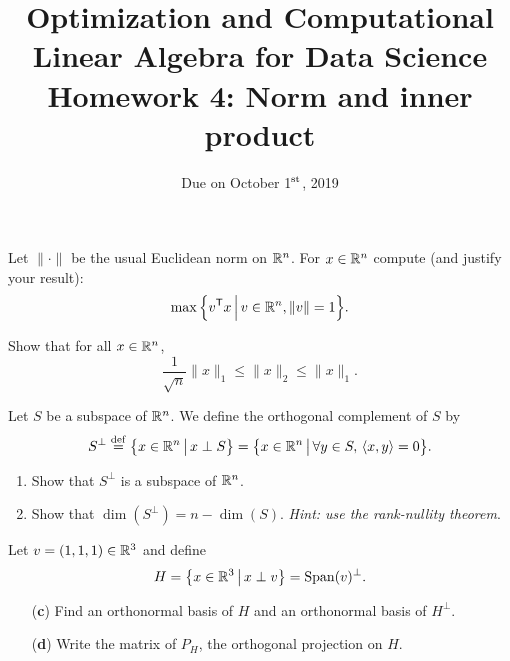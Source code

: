 \documentclass[11pt,nocut]{article}
\title{\vspace{-3.0cm}%
	Optimization and Computational Linear Algebra for Data Science\\
Homework 4: Norm and inner product}
\date{\vspace{-1cm}Due on October 1$^{\rm st}$, 2019}
\begin{document}
\maketitle




\begin{problem}[2 points]
	Let $\| \cdot \|$ be the usual Euclidean norm on $\mathbb{R}^n$.
	For $x \in \mathbb{R}^n$ compute (and justify your result):
	$$
	\max \Big\{ v^{{\sf T}} x \, \Big| \, v \in \mathbb{R}^n, \|v\|=1 \Big\}.
$$
\end{problem}

\vspace{1mm} 

\begin{problem}[2 points]
	Show that for all $x \in \mathbb{R}^n$,
	$$
	\frac{1}{\sqrt{n}} \|x\|_1 \leq \|x\|_2 \leq \|x\|_1.
	$$
\end{problem}

\vspace{1mm}



\begin{problem}[4 points]
	Let $S$ be a subspace of $\mathbb{R}^n$. We define the orthogonal complement of $S$ by
	$$
	S^{\perp} \overset{\rm def}{=} 
	\big\{ x \in \mathbb{R}^n \, \big| \, x \perp S \big\} = 
	\big\{ x \in \mathbb{R}^n \, \big| \, \forall y \in S, \, \langle x,y \rangle = 0 \big\}.
	$$
	\begin{enumerate}[label=\normalfont(\textbf{\alph*})]
		\item Show that $S^{\perp}$ is a subspace of $\mathbb{R}^n$.
		\item Show that $\dim(S^{\perp}) = n - \dim(S)$. \textit{Hint: use the rank-nullity theorem}.
	\end{enumerate}
	Let $v = (1,1,1) \in \mathbb{R}^3$ and define
	$$
	H = 
	\big\{ x \in \mathbb{R}^3 \, \big| \, x \perp v \big\} = {{\rm Span}}(v)^{\perp}.
	$$
	\begin{enumerate}[label=\normalfont(\textbf{\alph*})]
		\item[\normalfont(\textbf{c})] Find an orthonormal basis of $H$ and an orthonormal basis of $H^{\perp}$.
		\item[\normalfont(\textbf{d})] Write the matrix of $P_H$, the orthogonal projection on $H$.
	\end{enumerate}
\end{problem}

\vspace{1mm}
\end{document}
